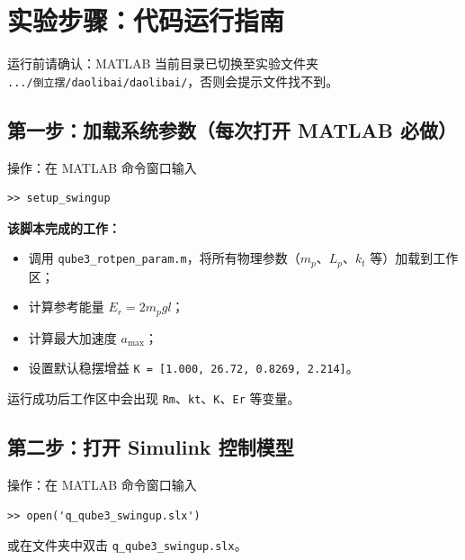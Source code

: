 \documentclass[12pt, a4paper]{article}
\begin{document}
\section{实验步骤：代码运行指南}

\begin{notebox}
运行前请确认：MATLAB 当前目录已切换至实验文件夹\\
\texttt{.../倒立摆/daolibai/daolibai/}，否则会提示文件找不到。
\end{notebox}

\subsection{第一步：加载系统参数（每次打开 MATLAB 必做）}

\begin{stepbox}{操作：在 MATLAB 命令窗口输入}
\begin{lstlisting}[style=matlab]
>> setup_swingup
\end{lstlisting}
\end{stepbox}

\textbf{该脚本完成的工作：}
\begin{itemize}
    \item 调用 \texttt{qube3\_rotpen\_param.m}，将所有物理参数（$m_p$、$L_p$、$k_t$ 等）加载到工作区；
    \item 计算参考能量 $E_r = 2m_p g l$；
    \item 计算最大加速度 $a_\text{max}$；
    \item 设置默认稳摆增益 \texttt{K = [1.000, 26.72, 0.8269, 2.214]}。
\end{itemize}

运行成功后工作区中会出现 \texttt{Rm}、\texttt{kt}、\texttt{K}、\texttt{Er} 等变量。

\subsection{第二步：打开 Simulink 控制模型}

\begin{stepbox}{操作：在 MATLAB 命令窗口输入}
\begin{lstlisting}[style=matlab]
>> open('q_qube3_swingup.slx')
\end{lstlisting}
\end{stepbox}

或在文件夹中双击 \texttt{q\_qube3\_swingup.slx}。
\end{document}
